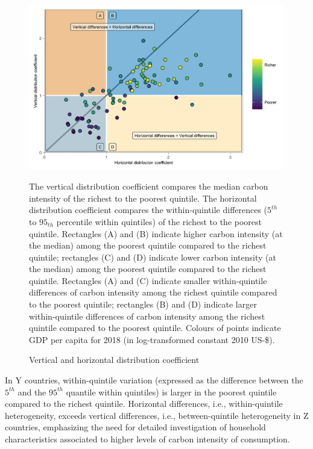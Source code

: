 \documentclass[12pt, a4paper]{article}
\newenvironment{subcaption}
{\strut
\vspace{-5pt}
\begin{minipage}[b]{0.9\textwidth}
  \hspace*{-\parindent}
  \footnotesize}
 {\end{minipage}}
\begin{document}
\begin{figure}[ht!]
    \centering
    \includegraphics{Figure 2/Figure_2}
    \caption{Vertical and horizontal distribution coefficient}
    \label{fig:fig_2}
    \begin{subcaption}
    The vertical distribution coefficient compares the median carbon intensity of the richest to the poorest quintile. The horizontal distribution coefficient compares the within-quintile differences ($5^{th}$ to $95_{th}$ percentile within quintiles) of the richest to the poorest quintile. Rectangles (A) and (B) indicate higher carbon intensity (at the median) among the poorest quintile compared to the richest quintile; rectangles (C) and (D) indicate lower carbon intensity (at the median) among the poorest quintile compared to the richest quintile. Rectangles (A) and (C) indicate smaller within-quintile differences of carbon intensity among the richest quintile compared to the poorest quintile; rectangles (B) and (D) indicate larger within-quintile differences of carbon intensity among the richest quintile compared to the poorest quintile. Colours of points indicate GDP per capita for 2018 (in log-transformed constant 2010 US-\$).
    \end{subcaption}
\end{figure}

In Y countries, within-quintile variation (expressed as the difference between the $5^{th}$ and the $95^{th}$ quantile within quintiles) is larger in the poorest quintile compared to the richest quintile. Horizontal differences, i.e., within-quintile heterogeneity, exceeds vertical differences, i.e., between-quintile heterogeneity in Z countries, emphasizing the need for detailed investigation of household characteristics associated to higher levels of carbon intensity of consumption. 
\end{document}
